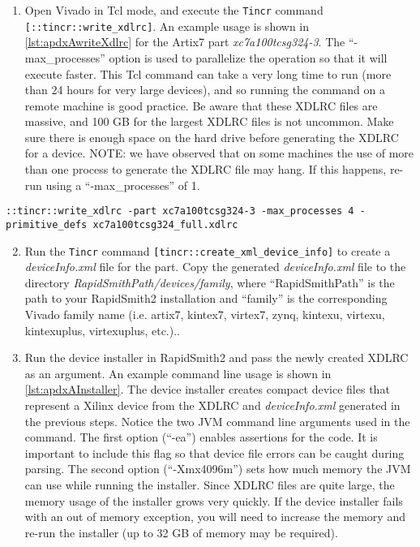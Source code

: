 \begin {enumerate}
\item Open Vivado in Tcl mode, and execute the \texttt{Tincr} command
\texttt{[::tincr::write\_xdlrc]}. An example usage is shown in
\autoref{lst:apdxAwriteXdlrc} for the Artix7 part \textit{xc7a100tcsg324-3}. The
``-max\_processes'' option is used to parallelize the operation so that it will
execute faster. This Tcl command can take a very long time to run (more than 24
hours for very large devices), and so running the command on a remote machine is
good practice. Be aware that these XDLRC files are massive, and 100 GB for the
largest XDLRC files is not uncommon. Make sure there is enough space on the
hard drive before generating the XDLRC for a device.  NOTE: we have observed
that on some machines the use of more than one process to generate the XDLRC
file may hang.  If this happens, re-run using a ``-max\_processes'' of 1.  

\end {enumerate}

\begin{lstlisting}[numbers=none, caption=XDLRC Generation Example, label=lst:apdxAwriteXdlrc] 
::tincr::write_xdlrc -part xc7a100tcsg324-3 -max_processes 4 -primitive_defs xc7a100tcsg324_full.xdlrc
\end{lstlisting}

\begin{enumerate}
\setcounter{enumi}{1} 
\item Run the \texttt{Tincr} command \texttt{[tincr::create\_xml\_device\_info]}
 to create a \textit{deviceInfo.xml} file for the part. Copy the generated
 \textit{deviceInfo.xml} file to the directory
 \textit{RapidSmithPath/devices/family}, where ``RapidSmithPath'' is the path to
 your RapidSmith2 installation and ``family'' is the corresponding Vivado
 family name (i.e. artix7, kintex7, virtex7, zynq, kintexu, virtexu,
 kintexuplus, virtexuplus, etc.)..

\item Run the device installer in RapidSmith2 and pass the newly created XDLRC
as an argument. An example command line usage is shown in
\autoref{lst:apdxAInstaller}. The device installer creates compact device files
that represent a Xilinx device from the XDLRC and \textit{deviceInfo.xml}
generated in the previous steps. Notice the two JVM command line arguments used
in the command. The first option (``-ea'') enables assertions for the code. It
is important to include this flag so that device file errors can be caught
during parsing. The second option (``-Xmx4096m'') sets how much memory the JVM
can use while running the installer. Since XDLRC files are quite large, the
memory usage of the installer grows very quickly. If the device installer fails
with an out of memory exception, you will need to increase the memory and
re-run the installer (up to 32 GB of memory may be required).
\end{enumerate}

